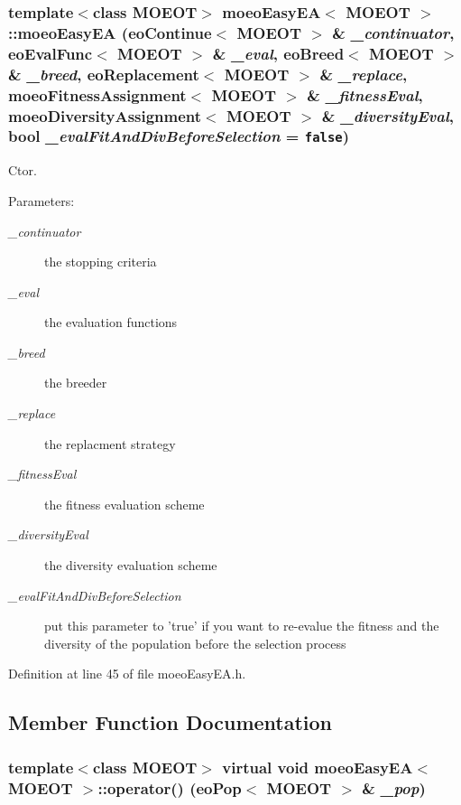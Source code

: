\subsubsection{\setlength{\rightskip}{0pt plus 5cm}template$<$class MOEOT$>$ {\bf moeo\-Easy\-EA}$<$ MOEOT $>$::{\bf moeo\-Easy\-EA} ({\bf eo\-Continue}$<$ MOEOT $>$ \& {\em \_\-continuator}, {\bf eo\-Eval\-Func}$<$ MOEOT $>$ \& {\em \_\-eval}, {\bf eo\-Breed}$<$ MOEOT $>$ \& {\em \_\-breed}, {\bf eo\-Replacement}$<$ MOEOT $>$ \& {\em \_\-replace}, {\bf moeo\-Fitness\-Assignment}$<$ MOEOT $>$ \& {\em \_\-fitness\-Eval}, {\bf moeo\-Diversity\-Assignment}$<$ MOEOT $>$ \& {\em \_\-diversity\-Eval}, bool {\em \_\-eval\-Fit\-And\-Div\-Before\-Selection} = {\tt false})\hspace{0.3cm}{\tt  [inline]}}\label{classmoeoEasyEA_7fe81a5e24bd69d9f6de172d2bbe059a}


Ctor. 

\begin{Desc}
\item[Parameters:]
\begin{description}
\item[{\em \_\-continuator}]the stopping criteria \item[{\em \_\-eval}]the evaluation functions \item[{\em \_\-breed}]the breeder \item[{\em \_\-replace}]the replacment strategy \item[{\em \_\-fitness\-Eval}]the fitness evaluation scheme \item[{\em \_\-diversity\-Eval}]the diversity evaluation scheme \item[{\em \_\-eval\-Fit\-And\-Div\-Before\-Selection}]put this parameter to 'true' if you want to re-evalue the fitness and the diversity of the population before the selection process \end{description}
\end{Desc}


Definition at line 45 of file moeo\-Easy\-EA.h.

\subsection{Member Function Documentation}
\subsubsection{\setlength{\rightskip}{0pt plus 5cm}template$<$class MOEOT$>$ virtual void {\bf moeo\-Easy\-EA}$<$ MOEOT $>$::operator() ({\bf eo\-Pop}$<$ MOEOT $>$ \& {\em \_\-pop})\hspace{0.3cm}{\tt  [inline, virtual]}}\label{classmoeoEasyEA_f18e8fd179fbb2b89f4a59d213317170}



